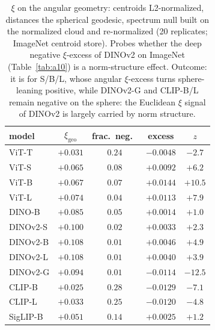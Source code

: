 \begin{table}[H]
\centering
\small
\begin{tabular}{lcccc}
\toprule
model & $\xi_{\text{geo}}$ & frac.\ neg.\ & excess & $z$ \\
\midrule
ViT-T & $+0.031$ & $0.24$ & $-0.0048$ & $-2.7$ \\
ViT-S & $+0.065$ & $0.08$ & $+0.0092$ & $+6.2$ \\
ViT-B & $+0.067$ & $0.07$ & $+0.0144$ & $+10.5$ \\
ViT-L & $+0.074$ & $0.04$ & $+0.0113$ & $+7.9$ \\
\midrule
DINO-B & $+0.085$ & $0.05$ & $+0.0014$ & $+1.0$ \\
DINOv2-S & $+0.100$ & $0.02$ & $+0.0033$ & $+2.3$ \\
DINOv2-B & $+0.108$ & $0.01$ & $+0.0046$ & $+4.9$ \\
DINOv2-L & $+0.108$ & $0.01$ & $+0.0040$ & $+3.9$ \\
DINOv2-G & $+0.094$ & $0.01$ & $-0.0114$ & $-12.5$ \\
\midrule
CLIP-B & $+0.025$ & $0.28$ & $-0.0129$ & $-7.1$ \\
CLIP-L & $+0.033$ & $0.25$ & $-0.0120$ & $-4.8$ \\
SigLIP-B & $+0.051$ & $0.14$ & $+0.0025$ & $+1.2$ \\
\bottomrule
\end{tabular}
\caption{$\xi$ on the angular geometry: centroids L2-normalized, distances the spherical geodesic, spectrum null built on the normalized cloud and re-normalized (20 replicates; ImageNet centroid store). Probes whether the deep negative $\xi$-excess of DINOv2 on ImageNet (Table~\ref{tab:a10}) is a norm-structure effect. Outcome: it is for S/B/L, whose angular $\xi$-excess turns sphere-leaning positive, while DINOv2-G and CLIP-B/L remain negative on the sphere: the Euclidean $\xi$ signal of DINOv2 is largely carried by norm structure.}
\label{tab:b19-xigeo}
\end{table}
